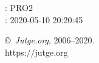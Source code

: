 \documentclass[11pt]{article}
\begin{document}
    \newcommand{\SampleTwoCol}{\SampleTwoColInputOutput{sample}{}}
    \newcommand{\SampleOneCol}{\SampleOneColInputOutput{sample}{}}

    \ProblemInformation
    \Author: PRO2\\    
    \Generation: 2020-05-10 20:20:45

    \bigskip

    \copyright\ \emph{Jutge.org}, 2006--2020. \\
    https:$/\!\!/$jutge.org
\end{document}
